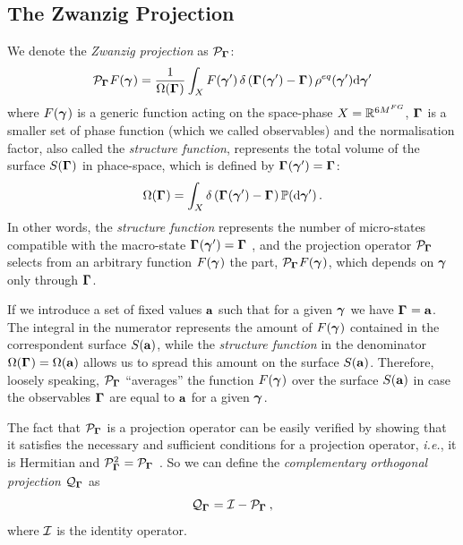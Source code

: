 \documentclass[10pt,a4paper]{book}
\theoremstyle{definition}
\begin{document}
\subsection{The Zwanzig Projection}
We denote the \emph{Zwanzig projection} as $\mathcal{P}_{\boldsymbol\Gamma_{}}$:
\begin{equation}\label{Eq:proj}
	\mathcal{P}_{\boldsymbol\Gamma_{}}F(\boldsymbol\gamma_{}) = \frac{1}{\Omega(\boldsymbol\Gamma_{})} \int_X F(\boldsymbol\gamma_{}')\,\delta\left({\boldsymbol\Gamma_{}(\boldsymbol\gamma_{}')-\boldsymbol\Gamma_{}}\right)\rho^{eq}(\boldsymbol\gamma_{}')\mbox{d}\boldsymbol\gamma_{}'
\end{equation}
where $F(\boldsymbol\gamma_{})$ is a generic function acting on the space-phase $X=\mathbb{R}^{6M^{FG}}$, $\boldsymbol\Gamma_{}$ is a smaller set of phase function (which we called observables) and the normalisation factor, also called the \textit{structure function}, represents the total volume of the surface $S(\boldsymbol\Gamma_{})$ in phace-space, which is defined by $\boldsymbol\Gamma_{}(\boldsymbol\gamma_{}')=\boldsymbol\Gamma_{}$:
%
\begin{equation}\label{eq:structurefunc}
	\Omega(\boldsymbol\Gamma_{}) = \int_X\delta\left({\boldsymbol\Gamma_{}(\boldsymbol\gamma_{}')-\boldsymbol\Gamma_{}}\right)\mathbb{P}(\mbox{d}\boldsymbol\gamma_{}')\,.
\end{equation}
In other words, the \textit{structure function} represents the number of micro-states compatible with the macro-state $\boldsymbol\Gamma_{}(\boldsymbol\gamma_{}')=\boldsymbol\Gamma_{}$ \cite{Hijon2010}, and the projection operator $\mathcal{P}_{\boldsymbol\Gamma_{}}$ selects from an arbitrary function $F(\boldsymbol\gamma_{})$ the part, $\mathcal{P}_{\boldsymbol\Gamma_{}}F(\boldsymbol\gamma_{})$, which depends on $\boldsymbol\gamma_{}$ only through $\boldsymbol\Gamma_{}$.

\noindent
If we introduce a set of fixed values $\mathbf{a}$ such that for a given $\boldsymbol\gamma_{}$ we have $\boldsymbol\Gamma_{}=\mathbf{a}$. The integral in the numerator represents the amount of $F(\boldsymbol\gamma_{})$ contained in the correspondent surface $S(\mathbf{a})$, while the \textit{structure function} in the denominator $\Omega(\boldsymbol\Gamma_{})=\Omega(\mathbf{a})$ allows us to spread this amount on the surface $S(\mathbf{a})$.
Therefore, loosely speaking, $\mathcal{P}_{\boldsymbol\Gamma_{}}$ ``averages'' the function $F(\boldsymbol\gamma_{})$ over the surface $S(\mathbf{a})$ in case the observables $\boldsymbol\Gamma_{}$ are equal to $\mathbf{a}$ for a given $\boldsymbol\gamma_{}$.

The fact that $\mathcal{P}_{\boldsymbol\Gamma_{}}$ is a projection operator can be easily verified by showing that it satisfies the necessary and
sufficient conditions for a projection operator, \textit{i.e.}, it is Hermitian and $\mathcal{P}_{\boldsymbol\Gamma_{}}^2=\mathcal{P}_{\boldsymbol\Gamma_{}}$ \cite{Zwanzig1961}.
So we can define the \emph{complementary orthogonal projection} $\mathcal{Q}_{\boldsymbol\Gamma_{}}$ as
$$
 \mathcal{Q}_{\boldsymbol\Gamma_{}}=\mathcal{I}-\mathcal{P}_{\boldsymbol\Gamma_{}}\,,
$$  
where $\mathcal{I}$ is the identity operator.
\end{document}
